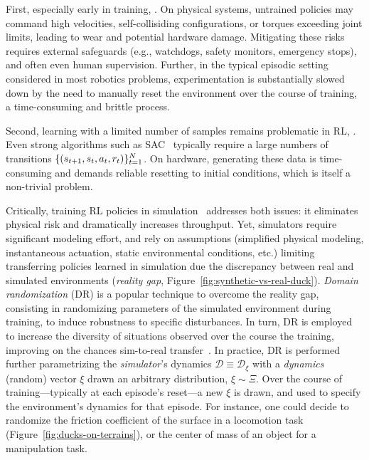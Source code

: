First, especially early in training, .
On physical systems, untrained policies may command high velocities, self-collisiding configurations, or torques exceeding joint limits, leading to wear and potential hardware damage.
Mitigating these risks requires external safeguards (e.g., watchdogs, safety monitors, emergency stops), and often even human supervision.
Further, in the typical episodic setting considered in most robotics problems, experimentation is substantially slowed down by the need to manually reset the environment over the course of training, a time-consuming and brittle process.

Second, learning with a limited number of samples remains problematic in RL, .
Even strong algorithms such as SAC~\citep{haarnojaSoftActorCriticOffPolicy2018} typically require a large numbers of transitions \( \{ (s_{t+1}, s_t, a_t, r_t) \}_{t=1}^N \).
On hardware, generating these data is time-consuming and demands reliable resetting to initial conditions, which is itself a non-trivial problem.

Critically, training RL policies in simulation~\citep{tobinDomainRandomizationTransferring2017} addresses both issues: it eliminates physical risk and dramatically increases throughput. 
Yet, simulators require significant modeling effort, and rely on assumptions (simplified physical modeling, instantaneous actuation, static environmental conditions, etc.) limiting transferring policies learned in simulation due the discrepancy between real and simulated environments (\emph{reality gap}, Figure~\ref{fig:synthetic-vs-real-duck}).
\emph{Domain randomization} (DR) is a popular technique to overcome the reality gap, consisting in randomizing parameters of the simulated environment during training, to induce robustness to specific disturbances.
In turn, DR is employed to increase the diversity of situations observed over the course the training, improving on the chances sim-to-real transfer~\citep{akkayaSolvingRubiksCube2019,antonovaReinforcementLearningPivoting2017,jiDribbleBotDynamicLegged2023}.
In practice, DR is performed further parametrizing the \emph{simulator}'s dynamics \( \mathcal D \equiv \mathcal D_\xi \) with a \emph{dynamics} (random) vector \( \xi \) drawn an arbitrary distribution, \( \xi \sim \Xi \).
Over the course of training---typically at each episode's reset---a new \( \xi \) is drawn, and used to specify the environment's dynamics for that episode.
For instance, one could decide to randomize the friction coefficient of the surface in a locomotion task (Figure~\ref{fig:ducks-on-terrains}), or the center of mass of an object for a manipulation task.

